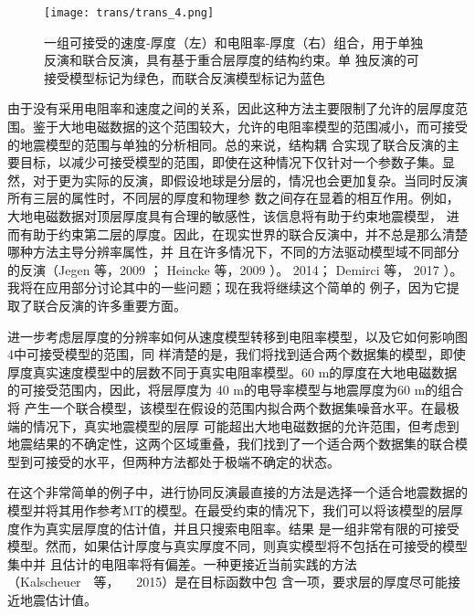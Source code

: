 \begin{figure}
    \centering
    \texttt{[image: trans/trans\_4.png]}
    \caption{一组可接受的速度-厚度（左）和电阻率-厚度（右）组合，用于单独反演和联合反演，具有基于重合层厚度的结构约束。单 独反演的可接受模型标记为绿色，而联合反演模型标记为蓝色}

\end{figure}

由于没有采用电阻率和速度之间的关系，因此这种方法主要限制了允许的层厚度范围。鉴于大地电磁数据的这个范围较大，允许的电阻率模型的范围减小，而可接受的地震模型的范围与单独的分析相同。总的来说，结构耦 合实现了联合反演的主要目标，以减少可接受模型的范围，即使在这种情况下仅针对一个参数子集。显然，对于更为实际的反演，即假设地球是分层的，情况也会更加复杂。当同时反演所有三层的属性时，不同层的厚度和物理参 数之间存在显着的相互作用。例如，大地电磁数据对顶层厚度具有合理的敏感性，该信息将有助于约束地震模型， 进而有助于约束第二层的厚度。因此，在现实世界的联合反演中，并不总是那么清楚哪种方法主导分辨率属性，并 且在许多情况下，不同的方法驱动模型域不同部分的反演（Jegen 等，2009 ； Heincke 等，2009 ）。 2014； Demirci 等， 2017 ）。我将在应用部分讨论其中的一些问题；现在我将继续这个简单的 例子，因为它提取了联合反演的许多重要方面。

进一步考虑层厚度的分辨率如何从速度模型转移到电阻率模型，以及它如何影响图4中可接受模型的范围，同 样清楚的是，我们将找到适合两个数据集的模型，即使厚度真实速度模型中的层数不同于真实电阻率模型。60 m的厚度在大地电磁数据的可接受范围内，因此，将层厚度为 40 m的电导率模型与地震厚度为60 m的组合将 产生一个联合模型，该模型在假设的范围内拟合两个数据集噪音水平。在最极端的情况下，真实地震模型的层厚 可能超出大地电磁数据的允许范围，但考虑到地震结果的不确定性，这两个区域重叠，我们找到了一个适合两个数据集的联合模型到可接受的水平，但两种方法都处于极端不确定的状态。

在这个非常简单的例子中，进行协同反演最直接的方法是选择一个适合地震数据的模型并将其用作参考MT的模型。在最受约束的情况下，我们可以将该模型的层厚度作为真实层厚度的估计值，并且只搜索电阻率。结果 是一组非常有限的可接受模型。然而，如果估计厚度与真实厚度不同，则真实模型将不包括在可接受的模型集中并 且估计的电阻率将有偏差。一种更接近当前实践的方法（Kalscheuer  等，   2015）是在目标函数中包 含一项，要求层的厚度尽可能接近地震估计值。

